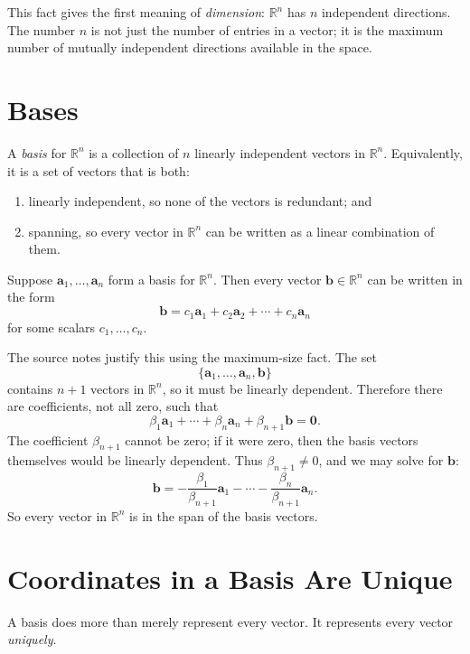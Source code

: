 This fact gives the first meaning of \emph{dimension}: \(\mathbb{R}^n\) has \(n\) independent directions. The number \(n\) is not just the number of entries in a vector; it is the maximum number of mutually independent directions available in the space.

\section{Bases}
\label{mf:bases}

A \emph{basis} for \(\mathbb{R}^n\) is a collection of \(n\) linearly independent vectors in \(\mathbb{R}^n\). Equivalently, it is a set of vectors that is both:
\begin{enumerate}
    \item linearly independent, so none of the vectors is redundant; and
    \item spanning, so every vector in \(\mathbb{R}^n\) can be written as a linear combination of them.
\end{enumerate}

Suppose \(\mathbf{a}_1,\ldots,\mathbf{a}_n\) form a basis for \(\mathbb{R}^n\). Then every vector \(\mathbf{b}\in\mathbb{R}^n\) can be written in the form
\[
    \mathbf{b}=c_1\mathbf{a}_1+c_2\mathbf{a}_2+\cdots+c_n\mathbf{a}_n
\]
for some scalars \(c_1,\ldots,c_n\).

The source notes justify this using the maximum-size fact. The set
\[
    \{\mathbf{a}_1,\ldots,\mathbf{a}_n,\mathbf{b}\}
\]
contains \(n+1\) vectors in \(\mathbb{R}^n\), so it must be linearly dependent. Therefore there are coefficients, not all zero, such that
\[
    \beta_1\mathbf{a}_1+\cdots+\beta_n\mathbf{a}_n+\beta_{n+1}\mathbf{b}=\mathbf{0}.
\]
The coefficient \(\beta_{n+1}\) cannot be zero; if it were zero, then the basis vectors themselves would be linearly dependent. Thus \(\beta_{n+1}\neq0\), and we may solve for \(\mathbf{b}\):
\[
    \mathbf{b}
    =
    -\frac{\beta_1}{\beta_{n+1}}\mathbf{a}_1
    -\cdots-
    \frac{\beta_n}{\beta_{n+1}}\mathbf{a}_n.
\]
So every vector in \(\mathbb{R}^n\) is in the span of the basis vectors.

\section{Coordinates in a Basis Are Unique}
\label{mf:coordinate-representation}

A basis does more than merely represent every vector. It represents every vector \emph{uniquely}.

